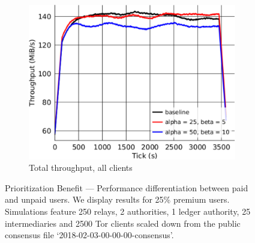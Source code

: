 \begin{figure}
\begin{subfigure}[t]{0.32\textwidth}
    \includegraphics[trim={0 0cm 0 0cm}, clip,
      width=1.0\textwidth]{images/modifier_pr25_all_lowloss.pdf}
    \caption{Total throughput, all clients}
    \label{fig:modifier_pr25_all}
  \end{subfigure}
  \caption{Prioritization Benefit --- Performance differentiation between paid and unpaid users.
    We display results for 25\% premium users.
    Simulations feature 250 relays, 2 authorities, 1 ledger authority, 25 intermediaries and 2500 Tor clients scaled down from the public consensus file `2018-02-03-00-00-00-consensus'.}
  \label{fig:modifier}
\end{figure}

